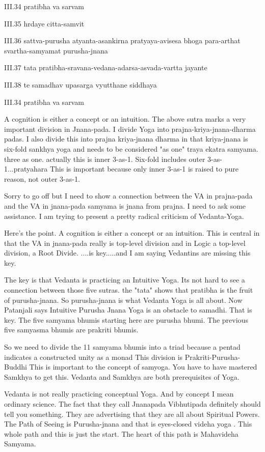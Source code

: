 III.34
pratibha va sarvam

III.35
hrdaye citta-samvit

III.36
sattva-purusha atyanta-asankirna pratyaya-avisesa bhoga para-arthat svartha-samyamat purusha-jnana

III.37
tata pratibha-sravana-vedana-adarsa-asvada-vartta jayante

III.38
te samadhav upasarga vyutthane siddhaya


III.34
pratibha va sarvam

A cognition is either a concept or an intuition.
The above sutra marks a very important division in Jnana-pada.
I divide Yoga into prajna-kriya-jnana-dharma padas.
I also divide this into prajna kriya-jnana dharma in that
kriya-jnana is six-fold sankhya yoga and needs to be considered
"as one" traya ekatra samyama. three as one. actually this is 
inner 3-as-1. Six-fold includes outer 3-as-1...pratyahara
This is important because only inner 3-as-1 is
raised to pure reason, not outer 3-as-1.

Sorry to go off but I need to show a connection 
between the VA in prajna-pada and the VA in jnana-pada
samyama is jnana from prajna. I need to ask some assistance.
I am trying to present a pretty radical criticism of Vedanta-Yoga.

Here's the point. A cognition is either a concept or an intuition.
This is central in that the VA in jnana-pada really is top-level
division and in Logic a top-level division, a Root Divide.
....is key.....and I am saying Vedantins are missing this key.

The key is that Vedanta is practicing an Intuitive Yoga.
Its not hard to see a connection between those five sutras.
the "tata" shows that pratibha is the fruit of purusha-jnana.
So purusha-jnana is what Vedanta Yoga is all about.
Now Patanjali says Intuitive Purusha Jnana Yoga is 
an obstacle to samadhi. That is key.
The five samyama bhumis starting here are purusha bhumi.
The previous five samyasma bhumis are prakriti bhumis.

So we need to divide the 11 samyama bhumis into a triad
because a pentad indicates a constructed unity as a monad
This division is Prakriti-Purusha-Buddhi
This is important to the concept of samyoga.
You have to have mastered Samkhya to get this.
Vedanta and Samkhya are both prerequisites of Yoga.

Vedanta is not really practicing conceptual Yoga.
And by concept I mean ordinary science.
The fact that they call Jnanapada Vibhutipada definitely
should tell you something. They are advertising that they
are all about Spiritual Powers. The Path of Seeing is Purusha-jnana
and that is eyes-closed videha yoga .
This whole path and this is just the start.
The heart of this path is Mahavideha Samyama.

